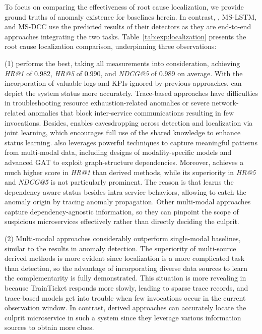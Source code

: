 To focus on comparing the effectiveness of root cause localization, we provide ground truths of anomaly existence for baselines herein.
In contrast, \name, MS-LSTM, and MS-DCC use the predicted results of their detectors as they are end-to-end approaches integrating the two tasks.
Table~\ref{tab:exp:localization} presents the root cause localization comparison, underpinning three observations:

(1) \name performs the best, taking all measurements into consideration, achieving \textit{HR@1} of 0.982, \textit{HR@5} of 0.990, and \textit{NDCG@5} of 0.989 on average.
With the incorporation of valuable logs and KPIs ignored by previous approaches, \name can depict the system status more accurately.
Trace-based approaches have difficulties in troubleshooting resource exhaustion-related anomalies or severe network-related anomalies that block inter-service communications resulting in few invocations.
Besides, \name enables eavesdropping across detection and localization via joint learning, which encourages full use of the shared knowledge to enhance status learning. 
\name also leverages powerful techniques to capture meaningful patterns from multi-modal data, including designs of modality-specific models and advanced GAT to exploit graph-structure dependencies. 
Moreover, \name achieves a much higher score in \textit{HR@1} than derived methods, while its superiority in \textit{HR@5} and \textit{NDCG@5} is not particularly prominent.
The reason is that \name learns the dependency-aware status besides intra-service behaviors, allowing to catch the anomaly origin by tracing anomaly propagation.
Other multi-modal approaches capture dependency-agnostic information, so they can pinpoint the scope of suspicious microservices effectively rather than directly deciding the culprit.

(2) Multi-modal approaches considerably outperform single-modal baselines, similar to the results in anomaly detection.
The superiority of multi-source derived methods is more evident since localization is a more complicated task than detection, so the advantage of incorporating diverse data sources to learn the complementarity is fully demonstrated.
This situation is more revealing in \A because TrainTicket responds more slowly, leading to sparse trace records, and trace-based models get into trouble when few invocations occur in the current observation window.
In contrast, derived approaches can accurately locate the culprit microservice in such a system since they leverage various information sources to obtain more clues.

